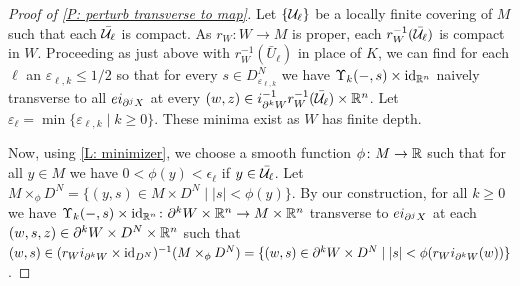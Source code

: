 \begin{proof}[Proof of \cref{P: perturb transverse to map}]

	Let $\{\mathcal{U}_\ell\}$ be a locally finite covering of $M$ such that each $\bar{\mathcal{U}_\ell}$ is compact.
	As $r_W \colon W \to M$ is proper, each $r^{-1}_W(\bar {\mathcal{U}_\ell})$ is compact in $W$.
	Proceeding as just above with $r_W^{-1}(\bar U_\ell)$ in place of $K$, we can find for each $\ell$ an $\varepsilon_{\ell,k} \leq 1/2$ so that for every $s \in D^N_{\varepsilon_{\ell,k}}$ we have $\Upsilon_k(-,s) \times \mathrm{id}_{\mathbb{R}^n}$ naively transverse to all $ei_{\partial^j X}$ at every $(w,z) \in i_{\partial^k W}^{-1} r^{-1}_W(\bar {\mathcal{U}_\ell}) \times \mathbb{R}^n$.
	Let $\varepsilon_\ell = \min\{\varepsilon_{\ell,k} \mid k\geq 0\}$.
	These minima exist as $W$ has finite depth.

	Now, using \cref{L: minimizer}, we choose a smooth function $\phi \colon M \to \mathbb{R}$ such that for all $y \in M$ we have $0<\phi(y)<\epsilon_\ell$ if $y \in \bar{\mathcal{U}_\ell}$.
	Let $M \times_\phi D^N = \{(y,s) \in M \times D^N \mid |s|<\phi(y)\}$.
	By our construction, for all $k\geq 0$ we have $\Upsilon_k(-,s) \times \mathrm{id}_{\mathbb{R}^n} \colon \partial^k W \times \mathbb{R}^n \to M \times \mathbb{R}^n$ transverse to $ei_{\partial^j X}$ at each $(w,s,z) \in \partial^k W \times D^N \times \mathbb{R}^n$ such that $(w,s) \in (r_Wi_{\partial^{k}W} \times \mathrm{id}_{D^N})^{-1}(M\times_\phi D^N) = \{(w,s) \in \partial^k W \times D^N \mid |s|<\phi(r_Wi_{\partial^k W}(w))\}$.


\end{proof}
